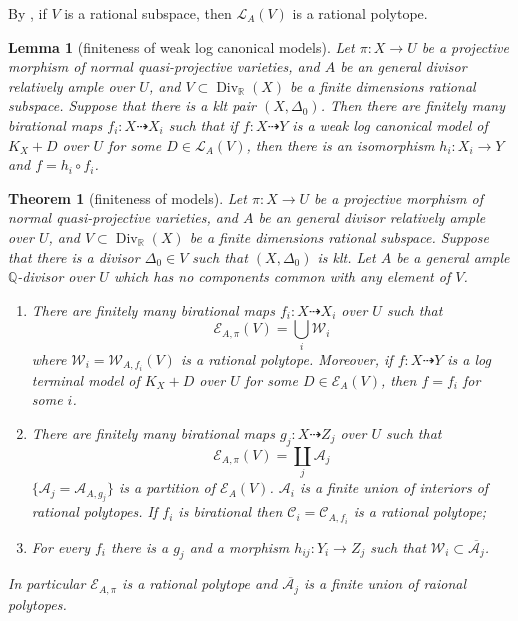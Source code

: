 \documentclass{article}
\newtheorem{lem}[defn]{Lemma}
\newtheorem{thm}[defn]{Theorem}
\begin{document}
By \cite[Lemma 3.7.2]{birkarExistenceMinimalModels2009}, if $V$  is a rational subspace, then $\mathcal{L}_{A}(V)$ is a rational polytope.
\begin{lem}[finiteness of weak log canonical models]\label{finitewlcm}
  Let $\pi:X\to U$ be a projective morphism of normal quasi-projective varieties, and $A$ be an general divisor relatively ample over $U$, and $V \subset \operatorname{Div}_{\mathbb{R}}(X)$ be a finite dimensions rational subspace. Suppose that there is a klt pair $(X,\Delta_{0})$. Then there are finitely many birational maps $f_{i}:X \dashrightarrow X_{i}$ such that if $f:X \dashrightarrow  Y$ is a weak log canonical model of $K_{X}+D$ over $U$ for some $D \in \mathcal{L}_{A}(V)$, then there is an isomorphism  $h_{i}:X_{i} \to Y$  and $f=h_{i}\circ f_{i}$.  

\end{lem}

\begin{thm}[finiteness of models]\label{finitemodel}
\cite[Corollary 1.1.5]{birkarExistenceMinimalModels2009}Let $\pi:X\to U$ be a projective morphism of normal quasi-projective varieties, and $A$ be an general divisor relatively ample over $U$, and $V \subset \operatorname{Div}_{\mathbb{R}}(X)$ be a finite dimensions rational subspace. Suppose that there is a divisor $\Delta_{0} \in V$ such that $(X,\Delta_{0})$ is klt. Let $A$ be a general ample $\mathbb{Q}$-divisor over $U$ which has no components common with any element of $V$.  
  \begin{enumerate}
    \item   There are finitely many birational maps $f_{i}:X \dashrightarrow   X_{i}$ over $U$ such that 
      \[
        \mathcal{E}_{A,\pi}(V) =\bigcup_{i}\mathcal{W}_{i}
      \]
      where  $\mathcal{W}_{i}=\mathcal{W}_{A,f_{i}}(V)$ is a rational polytope. Moreover, if  $f:X \dashrightarrow  Y$ is a  log terminal model of $K_{X}+D$ over $U$ for some $D \in \mathcal{E}_{A}(V)$, then  $f=f_{i}$ for some $i$.  

    \item   There are finitely many birational maps $g_{j}:X \dashrightarrow  Z_{j}$ over $U$ such that
      \[
        \mathcal{E}_{A,\pi}(V) =\coprod_{j}\mathcal{A}_{j}
      \]
      $ \{\mathcal{A}_j=\mathcal{A}_{A,g_j}\} $ is a partition of $ \mathcal{E}_{A}(V) $. $ \mathcal{A}_i $ is a finite union of interiors of rational polytopes. If $ f_i $ is birational then $ \mathcal{C}_i=\mathcal{C}_{A,f_i} $ is a rational polytope;
      \item  For every  $f_{i}$ there is a $g_{j}$ and a morphism $h_{ij}:Y_{i}\to Z_{j}$ such that $\mathcal{W}_{i} \subset \overline{\mathcal{A}_{j}}$.   
  \end{enumerate}
  In particular $\mathcal{E}_{A,\pi}$ is a rational polytope and  $\overline{\mathcal{A}_{j}}$ is a finite union of raional polytopes. 
\end{thm}
\end{document}
